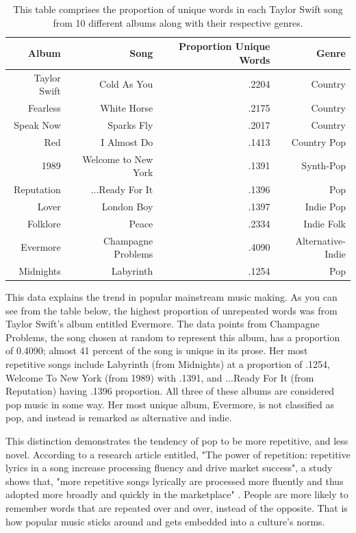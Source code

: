 \documentclass[12pt]{article}
\begin{document}
\begin{table}[tbp]
  \caption{This table comprises the proportion of unique words in each Taylor Swift song from 10 different albums along with their respective genres.}
  \label{tab:rv}
\centering
\begin{tabular}{rrrr}
  \toprule
Album & Song & Proportion Unique Words & Genre \\ 
  \midrule
Taylor Swift & Cold As You & .2204 & Country \\ 
  Fearless & White Horse & .2175 & Country \\ 
  Speak Now & Sparks Fly & .2017 & Country \\ 
  Red & I Almost Do & .1413 & Country Pop\\ 
  1989 & Welcome to New York & .1391 & Synth-Pop \\ 
  Reputation & ...Ready For It & .1396 & Pop\\ 
  Lover & London Boy & .1397 & Indie Pop \\ 
  Folklore & Peace & .2334 & Indie Folk \\ 
  Evermore & Champagne Problems & .4090 & Alternative-Indie\\ 
  Midnights & Labyrinth & .1254 & Pop\\ 
   \bottomrule
\end{tabular}
\end{table}




This data explains the trend in popular mainstream music making. As you can see from the table below, the highest proportion of unrepeated words was from Taylor Swift's album entitled Evermore. The data points from Champagne Problems, the song chosen at random to represent this album, has a proportion of 0.4090; almost 41 percent of the song is unique in its prose. Her most repetitive songs include Labyrinth (from Midnights) at a proportion of .1254, Welcome To New York (from 1989) with .1391, and ...Ready For It (from Reputation) having .1396 proportion. All three of these albums are considered pop music in some way. Her most unique album, Evermore, is not classified as pop, and instead is remarked as alternative and indie. 

This distinction demonstrates the tendency of pop to be more repetitive, and less novel. According to a research article entitled, "The power of repetition: repetitive lyrics in a song increase processing fluency and drive market success", a study shows that, "more repetitive songs lyrically are processed more fluently and thus adopted more broadly and quickly in the marketplace" \citep{Nunes2015power}. People are more likely to remember words that are repeated over and over, instead of the opposite. That is how popular music sticks around and gets embedded into a culture's norms. 
\end{document}
